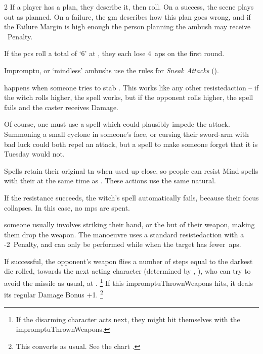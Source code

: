 \begin{multicols}{2}
If a player has a plan, they describe it, then roll.
On a success, the scene plays out as planned.
On a failure, the \gls{gm} describes how this plan goes wrong, and if the Failure Margin is high enough the person planning the \gls{ambush} may receive ~Penalty.

\begin{exampletext}
  If the \glspl{pc} roll a total of `6' at \tn[10], they each lose 4~\glspl{ap} on the first \gls{round}.
\end{exampletext}

Impromptu, or `mindless' \glspl{ambush} use the rules for \textit{Sneak Attacks} ().

happens when someone tries to stab .
This works like any other \gls{resistedaction} -- if the \gls{witch} rolls higher, the spell works, but if the opponent rolls higher, the spell fails and the caster receives Damage.

Of course, one must use a spell which could plausibly impede the attack.
Summoning a small cyclone in someone's face, or cursing their sword-arm with bad luck could both repel an attack, but a spell to make someone forget that it is Tuesday would not.

Spells retain their original \gls{tn} when used up close, so people can resist Mind spells with their  at the same time as .
These actions use the same \gls{natural}.

If the  resistance succeeds, the \gls{witch}'s spell automatically fails, because their focus collapses.
In this case, no \glspl{mp} are spent.

someone usually involves striking their hand, or the but of their weapon, making them drop the weapon.
The manoeuvre uses a standard  \gls{resistedaction} with a -2~Penalty, and can only be performed while when the target has fewer~\glspl{ap}.

If successful, the opponent's weapon flies a number of \glspl{step} equal to the darkest die rolled, towards the next acting character (determined by , ), who can try to avoid the missile as usual, at \tn[12].%
\footnote{If the disarming character acts next, they might hit themselves with the \gls{impromptuThrownWeapons}.}
If this \gls{impromptuThrownWeapons} hits, it deals its regular Damage Bonus +1.%
\footnote{This converts as usual.
See the chart .}


\end{multicols}
